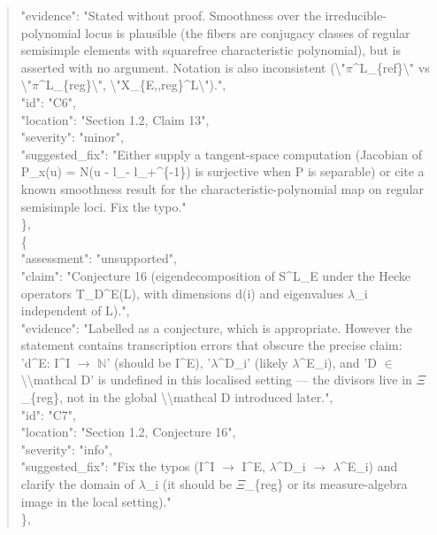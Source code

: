 \documentclass[11pt]{article}
\begin{document}
\begin{quote}
      "evidence": "Stated without proof. Smoothness over the irreducible-polynomial locus is plausible (the fibers are conjugacy classes of regular semisimple elements with squarefree characteristic polynomial), but is asserted with no argument. Notation is also inconsistent (\textbackslash{}"\ensuremath{\pi}\^{}L\_\{ref\}\textbackslash{}" vs \textbackslash{}"\ensuremath{\pi}\^{}L\_\{reg\}\textbackslash{}", \textbackslash{}"X\_\{E,,reg\}\^{}L\textbackslash{}").",\\
      "id": "C6",\\
      "location": "Section 1.2, Claim 13",\\
      "severity": "minor",\\
      "suggested\_fix": "Either supply a tangent-space computation (Jacobian of P\_x(u) = N(u - l\_- l\_+\^{}\{-1\}) is surjective when P is separable) or cite a known smoothness result for the characteristic-polynomial map on regular semisimple loci. Fix the typo."\\
    \},\\
    \{\\
      "assessment": "unsupported",\\
      "claim": "Conjecture 16 (eigendecomposition of S\^{}L\_E under the Hecke operators T\_D\^{}E(L), with dimensions d(i) and eigenvalues \ensuremath{\lambda}\_i independent of L).",\\
      "evidence": "Labelled as a conjecture, which is appropriate. However the statement contains transcription errors that obscure the precise claim: 'd\^{}E: I\^{}I \ensuremath{\to} \ensuremath{\mathbb{N}}' (should be I\^{}E), '\ensuremath{\lambda}\^{}D\_i' (likely \ensuremath{\lambda}\^{}E\_i), and 'D \ensuremath{\in} \textbackslash{}\textbackslash{}mathcal D' is undefined in this localised setting --- the divisors live in \ensuremath{\Xi}\_\{reg\}, not in the global \textbackslash{}\textbackslash{}mathcal D introduced later.",\\
      "id": "C7",\\
      "location": "Section 1.2, Conjecture 16",\\
      "severity": "info",\\
      "suggested\_fix": "Fix the typos (I\^{}I \ensuremath{\to} I\^{}E, \ensuremath{\lambda}\^{}D\_i \ensuremath{\to} \ensuremath{\lambda}\^{}E\_i) and clarify the domain of \ensuremath{\lambda}\_i (it should be \ensuremath{\Xi}\_\{reg\} or its measure-algebra image in the local setting)."\\
    \},\\

\end{quote}
\end{document}
